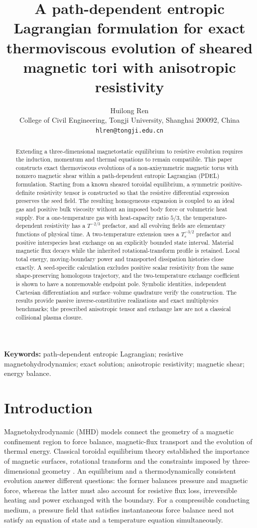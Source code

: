 \documentclass[11pt,a4paper]{article}
\title{\bfseries A path-dependent entropic Lagrangian formulation for exact thermoviscous evolution of sheared magnetic tori with anisotropic resistivity}
\author{Huilong Ren\\[0.3em]
\small College of Civil Engineering, Tongji University, Shanghai 200092, China\\
\small \texttt{hlren@tongji.edu.cn}}
\date{}
\theoremstyle{remark}\newtheorem{remark}{Remark}
\numberwithin{equation}{section}
\begin{document}
\maketitle
\begin{abstract}
Extending a three-dimensional magnetostatic equilibrium to resistive evolution requires the induction, momentum and thermal equations to remain compatible. This paper constructs exact thermoviscous evolutions of a non-axisymmetric magnetic torus with nonzero magnetic shear within a path-dependent entropic Lagrangian (PDEL) formulation. Starting from a known sheared toroidal equilibrium, a symmetric positive-definite resistivity tensor is constructed so that the resistive differential expression preserves the seed field. The resulting homogeneous expansion is coupled to an ideal gas and positive bulk viscosity without an imposed body force or volumetric heat supply. For a one-temperature gas with heat-capacity ratio $5/3$, the temperature-dependent resistivity has a $T^{-2/3}$ prefactor, and all evolving fields are elementary functions of physical time. A two-temperature extension uses a $T_e^{-3/2}$ prefactor and positive interspecies heat exchange on an explicitly bounded state interval. Material magnetic flux decays while the inherited rotational-transform profile is retained. Local total energy, moving-boundary power and transported dissipation histories close exactly. A seed-specific calculation excludes positive scalar resistivity from the same shape-preserving homologous trajectory, and the two-temperature exchange coefficient is shown to have a nonremovable endpoint pole. Symbolic identities, independent Cartesian differentiation and surface--volume quadrature verify the construction. The results provide passive inverse-constitutive realizations and exact multiphysics benchmarks; the prescribed anisotropic tensor and exchange law are not a classical collisional plasma closure.
\end{abstract}
\noindent\textbf{Keywords:} path-dependent entropic Lagrangian; resistive magnetohydrodynamics; exact solution; anisotropic resistivity; magnetic shear; energy balance.
\section{Introduction}\label{sec:intro}
Magnetohydrodynamic (MHD) models connect the geometry of a magnetic confinement region to force balance, magnetic-flux transport and the evolution of thermal energy. Classical toroidal equilibrium theory established the importance of magnetic surfaces, rotational transform and the constraints imposed by three-dimensional geometry \citep{Kruskal1958,Grad1967,Helander2014}. An equilibrium and a thermodynamically consistent evolution answer different questions: the former balances pressure and magnetic force, whereas the latter must also account for resistive flux loss, irreversible heating and power exchanged with the boundary. For a compressible conducting medium, a pressure field that satisfies instantaneous force balance need not satisfy an equation of state and a temperature equation simultaneously.
\end{document}

